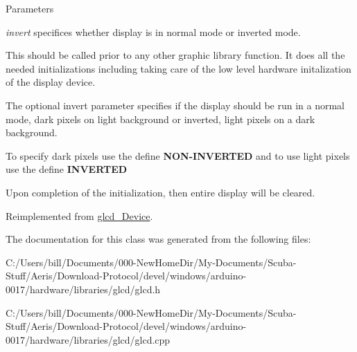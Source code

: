 \begin{DoxyParams}{Parameters}
\item[{\em invert}]specifices whether display is in normal mode or inverted mode.\end{DoxyParams}
This should be called prior to any other graphic library function. It does all the needed initializations including taking care of the low level hardware initalization of the display device.

The optional invert parameter specifies if the display should be run in a normal mode, dark pixels on light background or inverted, light pixels on a dark background.

To specify dark pixels use the define {\bfseries NON-\/INVERTED} and to use light pixels use the define {\bfseries INVERTED} 

Upon completion of the initialization, then entire display will be cleared. 

Reimplemented from \hyperlink{classglcd___device_a15bd97b27644f9962f2e50a442b4cdcc}{glcd\_\-Device}.

The documentation for this class was generated from the following files:\begin{DoxyCompactItemize}
\item 
C:/Users/bill/Documents/000-\/NewHomeDir/My-\/Documents/Scuba-\/Stuff/Aeris/Download-\/Protocol/devel/windows/arduino-\/0017/hardware/libraries/glcd/glcd.h\item 
C:/Users/bill/Documents/000-\/NewHomeDir/My-\/Documents/Scuba-\/Stuff/Aeris/Download-\/Protocol/devel/windows/arduino-\/0017/hardware/libraries/glcd/glcd.cpp\end{DoxyCompactItemize}
